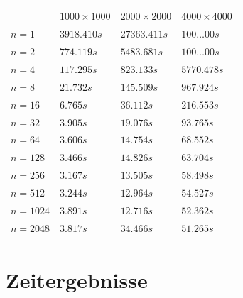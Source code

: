 \documentclass{beamer}
\begin{document}
	\begin{frame}[plain]
		\begin{table}[H]
			\centering
			\begin{tabular}{|m{2cm}||m{2.5cm}|m{2.5cm}|m{2.5cm}|} 
				\hline
				\diagbox[width=\dimexpr \textwidth/8+3\tabcolsep\relax, height=1cm]{}{}& $1000\times 1000$ & $2000\times2000$ & $4000\times4000$ \\ [0.5ex] 
				\hline\hline
				$n=1$ & $3918.410s$ & $27363.411s$ & $100\ldots00 s$\\[1ex]
				\hline
				$n=2$ & $774.119s$ & $5483.681s$ & $100\ldots00 s$\\[1ex]
				\hline
				$n=4$ & $117.295s$ & $823.133s$ & $5770.478s$\\[1ex]
				\hline
				$n=8$ & $21.732s$ & $145.509s$ & $967.924s$\\[1ex]
				\hline
				$n=16$ & $6.765s$ & $36.112s$ & $216.553s$\\[1ex]
				\hline
				$n=32$ & $3.905s$ & $19.076s$ & $93.765s$\\[1ex]
				\hline
				$n=64$ & $3.606s$ & $14.754s$ & $68.552s$\\[1ex]
				\hline
				$n=128$ & $3.466s$ &$14.826s$ &$63.704s$\\[1ex]
				\hline
				$n=256$ & $3.167s$ & $13.505s$ &$58.498s$\\[1ex]
				\hline
				$n=512$ & $3.244s$ & $12.964s$ & $54.527s$\\[1ex]
				\hline
				$n=1024$ & $3.891s$ & $12.716s$ & $52.362s$\\[1ex]
				\hline
				$n=2048$ & $3.817s$ & $34.466s$ & $51.265s$\\[1ex]
				\hline
			\end{tabular}
		\end{table}
	\end{frame}
	
	\section{Zeitergebnisse}
	
\end{document}
